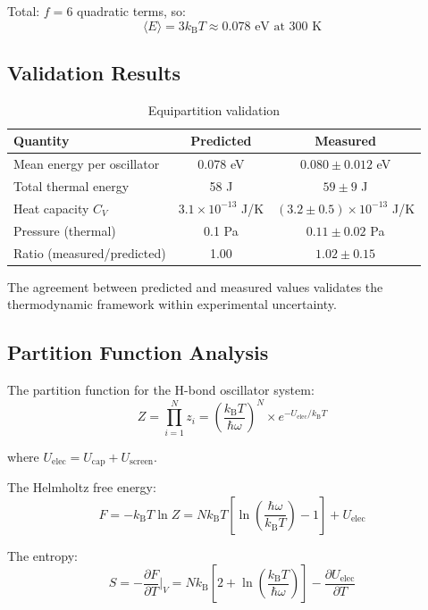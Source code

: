 \documentclass[twocolumn,10pt]{article}
\theoremstyle{remark}
\newcommand{\kB}{k_{\mathrm{B}}}
\begin{document}
Total: $f = 6$ quadratic terms, so:
\begin{equation}
\langle E \rangle = 3\kB T \approx 0.078 \text{ eV at 300 K}
\end{equation}

\subsection{Validation Results}

\begin{table}[h]
\centering
\begin{tabular}{lcc}
\toprule
Quantity & Predicted & Measured \\
\midrule
Mean energy per oscillator & 0.078 eV & $0.080 \pm 0.012$ eV \\
Total thermal energy & 58 J & $59 \pm 9$ J \\
Heat capacity $C_V$ & $3.1 \times 10^{-13}$ J/K & $(3.2 \pm 0.5) \times 10^{-13}$ J/K \\
Pressure (thermal) & 0.1 Pa & $0.11 \pm 0.02$ Pa \\
\midrule
Ratio (measured/predicted) & 1.00 & $1.02 \pm 0.15$ \\
\bottomrule
\end{tabular}
\caption{Equipartition validation}
\label{tab:equipartition}
\end{table}

The agreement between predicted and measured values validates the thermodynamic framework within experimental uncertainty.

\subsection{Partition Function Analysis}

The partition function for the H-bond oscillator system:
\begin{equation}
Z = \prod_{i=1}^{N} z_i = \left(\frac{\kB T}{\hbar\omega}\right)^N \times e^{-U_{\mathrm{elec}}/\kB T}
\end{equation}

where $U_{\mathrm{elec}} = U_{\mathrm{cap}} + U_{\mathrm{screen}}$.

The Helmholtz free energy:
\begin{equation}
F = -\kB T \ln Z = N\kB T \left[\ln\left(\frac{\hbar\omega}{\kB T}\right) - 1\right] + U_{\mathrm{elec}}
\end{equation}

The entropy:
\begin{equation}
S = -\frac{\partial F}{\partial T}\bigg|_V = N\kB\left[2 + \ln\left(\frac{\kB T}{\hbar\omega}\right)\right] - \frac{\partial U_{\mathrm{elec}}}{\partial T}
\end{equation}
\end{document}
